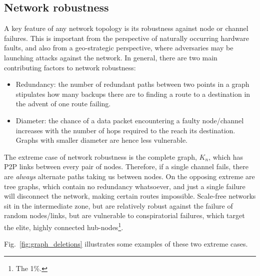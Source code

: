 \subsection{Network robustness}

A key feature of any network topology is its robustness against node or channel failures. This is important from the perspective of naturally occurring hardware faults, and also from a geo-strategic perspective, where adversaries may be launching attacks against the network. In general, there are two main contributing factors to network robustness:
\begin{itemize}
	\item Redundancy: the number of redundant paths between two points in a graph stipulates how many backups there are to finding a route to a destination in the advent of one route failing.
	\item Diameter: the chance of a data packet encountering a faulty node/channel increases with the number of hops required to the reach its destination. Graphs with smaller diameter are hence less vulnerable.
\end{itemize}

The extreme case of network robustness is the complete graph, $K_n$, which has P2P links between every pair of nodes. Therefore, if a single channel fails, there are \textit{always} alternate paths taking us between nodes. On the opposing extreme are tree graphs, which contain no redundancy whatsoever, and just a single failure will disconnect the network, making certain routes impossible. Scale-free networks sit in the intermediate zone, but are relatively robust against the failure of random nodes/links, but are vulnerable to conspiratorial failures, which target the elite, highly connected hub-nodes\footnote{The 1\%.}.

Fig.~\ref{fig:graph_deletions} illustrates some examples of these two extreme cases.

